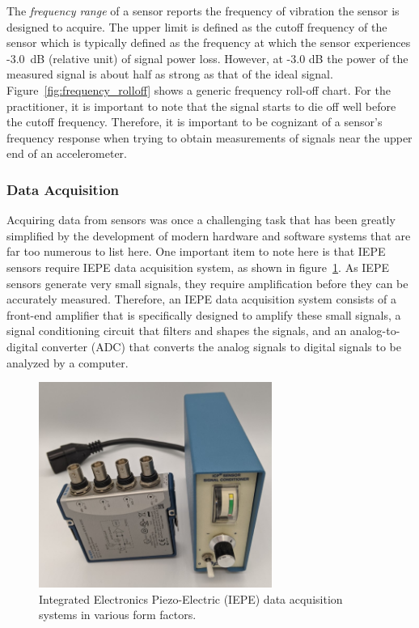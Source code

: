 \documentclass[12pt,letter]{article}
\begin{document}



The \emph{frequency range} of a sensor reports the frequency of vibration the sensor is designed to acquire. The upper limit is defined as the cutoff frequency of the sensor which is typically defined as the frequency at which the sensor experiences -3.0~dB (relative unit) of signal power loss. However, at -3.0 dB the power of the measured signal is about half as strong as that of the ideal signal. Figure~\ref{fig:frequency_rolloff} shows a generic frequency roll-off chart. For the practitioner, it is important to note that the signal starts to die off well before the cutoff frequency. Therefore, it is important to be cognizant of a sensor's frequency response when trying to obtain measurements of signals near the upper end of an accelerometer. 





\subsubsection{Data Acquisition}

Acquiring data from sensors was once a challenging task that has been greatly simplified by the development of modern hardware and software systems that are far too numerous to list here. One important item to note here is that IEPE sensors require IEPE data acquisition system, as shown in figure~\ref{fig:IEPE}.  As IEPE sensors generate very small signals, they require amplification before they can be accurately measured. Therefore, an IEPE data acquisition system consists of a front-end amplifier that is specifically designed to amplify these small signals, a signal conditioning circuit that filters and shapes the signals, and an analog-to-digital converter (ADC) that converts the analog signals to digital signals to be analyzed by a computer.

\begin{figure}[H]
    \centering
    \includegraphics[width=3.0in]{../figures/IEPE.png}
    \caption{Integrated Electronics Piezo-Electric (IEPE) data acquisition systems in various form factors.}
    \label{fig:IEPE}
\end{figure} 
\end{document}
